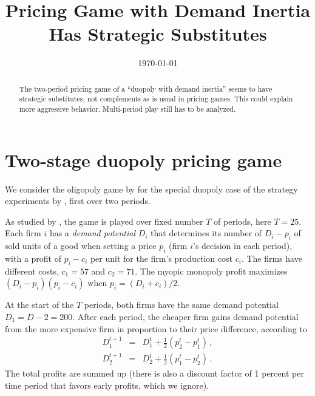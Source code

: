 \documentclass[a4paper,12pt]{article}  %
\title{%
Pricing Game with Demand Inertia Has Strategic Substitutes
}
\author{
}
\date{\today
\\[1ex]
}
\theoremstyle{definition}
\begin{document}
\maketitle

\begin{abstract}
The two-period pricing game of a ``duopoly with demand
inertia'' seems to have strategic substitutes, not
complements as is usual in pricing games.
This could explain more aggressive behavior.
Multi-period play still has to be analyzed.

% 
% 
% 
% 
% 
% 
% 
% 
\end{abstract}

\section{Two-stage duopoly pricing game} 
\label{s-two}

We consider the oligopoly game by \citet{Selten1965} for
the special duopoly case of the strategy experiments by
\citet{Keser1992}, first over two periods.

As studied by \citet{Keser1992}, the game is played over
fixed number $T$ of periods, here $T=25$.
Each firm $i$ has a \textit{demand potential} $D_i$
that determines its number of $D_i-p_i$ of sold units of a
good when setting a price $p_i$ (firm $i$'s decision in each
period), with a profit of $p_i-c_i$ per unit for the firm's
production cost $c_i$.
The firms have different costs, $c_1=57$ and $c_2=71$.
The myopic monopoly profit maximizes $(D_i-p_i)(p_i-c_i)$
when $p_i=(D_i+c_i)/2$.

At the start of the $T$ periods, both firms have the same
demand potential $D_1=D-2=200$.
After each period, the cheaper firm gains demand potential
from the more expensive firm in proportion to their price
difference, according to
\begin{equation}
\label{demand}
\begin{array}{rcl}
D_1^{t+1}&=&D_1^t+\frac12({p_{2}^t-p_1^t})\,,
\\[1ex]
D_2^{t+1}&=&D_2^t+\frac12({p_{1}^t-p_2^t})\,.
\end{array}
\end{equation}
The total profits are summed up (there is also a discount
factor of 1 percent per time period that favors early
profits, which we ignore).
\end{document}
